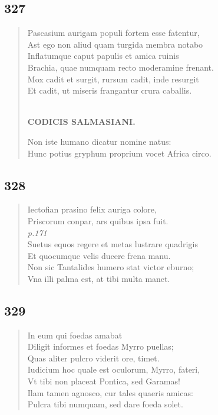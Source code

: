 \documentclass[11pt, a4paper]{report}
\begin{document}
            \subsection*{327}
      \begin{verse}
      Pascasium aurigam populi fortem esse fatentur, \\ Ast ego non aliud quam turgida membra notabo \\ Inflatumque caput papulis et amica ruinis \\ Brachia, quae numquam recto moderamine frenant. \\ Mox cadit et surgit, rursum cadit, inde resurgit \\ Et cadit, ut miseris frangantur crura caballis. \\ 
        ﻿\pagebreak 
    \begin{center} \textbf{CODICIS SALMASIANI.} \end{center} \marginpar{[267]} Non iste humano dicatur nomine natus: \\ Hunc potius gryphum proprium vocet Africa circo. \\ 
      \end{verse}
  
            \subsection*{328}
      \begin{verse}
      Iectofian prasino felix auriga colore, \\ Priscorum conpar, ars quibus ipsa fuit. \\ \textit{p.171} \\ Suetus equos regere  \lbrack et \rbrack  metas lustrare quadrigis \\ Et quocumque velis ducere frena manu. \\ Non sic Tantalides humero stat victor eburno; \\ Vna illi palma est, at tibi multa manet. \\ 
      \end{verse}
  
            \subsection*{329}
      \begin{verse}
      In eum qui foedas amabat \\ Diligit informes et foedas Myrro puellas; \\ Quas aliter pulcro viderit ore, timet. \\ Iudicium hoc quale est oculorum, Myrro, fateri, \\ Vt tibi non placeat Pontica, sed Garamas! \\ Ilam tamen agnosco, cur tales quaeris amicas: \\ Pulcra tibi numquam, sed dare foeda solet. \\ 
      \end{verse}
  
\end{document}
